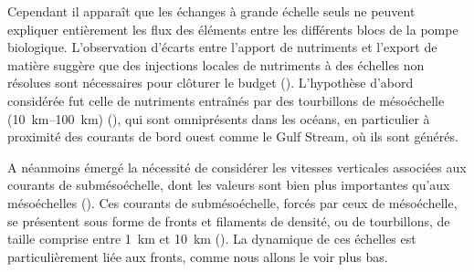 \begin{figure}
  \centering
  \label{fig:nutricline-globale}
\end{figure}

Cependant il apparaît que les échanges à grande échelle seuls ne peuvent expliquer entièrement les flux des éléments entre les différents blocs de la pompe biologique.
L'observation d'écarts entre l'apport de nutriments et l'export de matière  suggère que des injections locales de nutriments à des échelles non résolues sont nécessaires pour clôturer le budget (\cite{mcgillicuddy_1998,oschlies_2002}).
L'hypothèse d'abord considérée fut celle de nutriments entraînés par des tourbillons de mésoéchelle (\qtyrange{10}{100}{\km}) (\cite{mcgillicuddy_2016}), qui sont omniprésents dans les océans, en particulier à proximité des courants de bord ouest comme le Gulf Stream, où ils sont générés.

A néanmoins émergé la nécessité de considérer les vitesses verticales associées aux courants de submésoéchelle, dont les valeurs sont bien plus importantes qu'aux mésoéchelles (\cite{klein_2009}).
Ces courants de submésoéchelle, forcés par ceux de mésoéchelle, se présentent sous forme de fronts et filaments de densité, ou de tourbillons, de taille comprise entre \qty{1}{\km} et \qty{10}{\km} ().
La dynamique de ces échelles est particulièrement liée aux fronts, comme nous allons le voir plus bas.

\begin{figure}
  \centering
  \label{fig:finescales-photos}
\end{figure}

